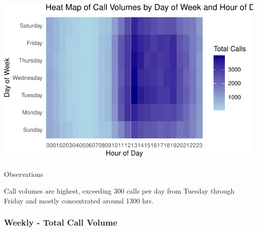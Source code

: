 \documentclass[
  letterpaper,
  DIV=11,
  numbers=noendperiod]{scrartcl}
\makeatletter
\let\oldparagraph\paragraph
\renewcommand{\paragraph}{
    \@ifstar
      \xxxParagraphStar
      \xxxParagraphNoStar
  }
\newcommand{\xxxParagraphStar}[1]{\oldparagraph*{#1}\mbox{}}
\newcommand{\xxxParagraphNoStar}[1]{\oldparagraph{#1}\mbox{}}
\makeatother
\begin{document}
\includegraphics{final_proj_group1_files/figure-pdf/day_vs_hour-1.pdf}

\paragraph{Observations}\label{observations-5}

Call volumes are highest, exceeding 300 calls per day from Tuesday
through Friday and mostly concentrated around 1300 hrs.

\subsubsection{Weekly - Total Call
Volume}\label{weekly---total-call-volume}
\end{document}
